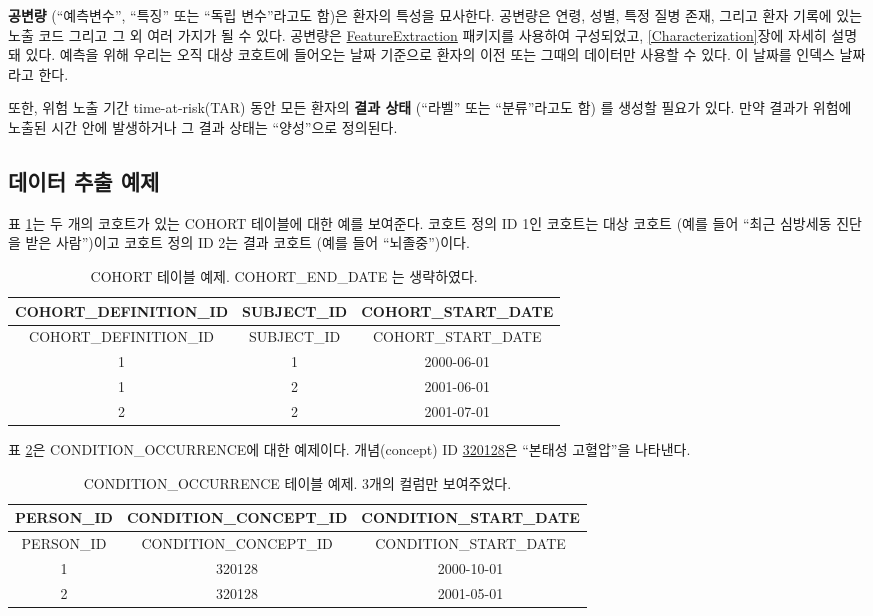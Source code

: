 \documentclass[10.5pt]{book}
\theoremstyle{definition}
\theoremstyle{definition}
\theoremstyle{definition}
\theoremstyle{remark}
\begin{document}
\textbf{공변량} (``예측변수'', ``특징'' 또는 ``독립 변수''라고도 함)은
환자의 특성을 묘사한다. 공변량은 연령, 성별, 특정 질병 존재, 그리고 환자
기록에 있는 노출 코드 그리고 그 외 여러 가지가 될 수 있다. 공변량은
\href{https://ohdsi.github.io/FeatureExtraction/}{FeatureExtraction}
패키지를 사용하여 구성되었고, \ref{Characterization}장에 자세히 설명돼
있다. 예측을 위해 우리는 오직 대상 코호트에 들어오는 날짜 기준으로
환자의 이전 또는 그때의 데이터만 사용할 수 있다. 이 날짜를 인덱스
날짜라고 한다.

또한, 위험 노출 기간 time-at-risk(TAR) 동안 모든 환자의 \textbf{결과
상태} (``라벨'' 또는 ``분류''라고도 함) 를 생성할 필요가 있다. 만약
결과가 위험에 노출된 시간 안에 발생하거나 그 결과 상태는 ``양성''으로
정의된다.  

\subsection{데이터 추출 예제}\label{--}

표 \ref{tab:plpExampleCohorts}는 두 개의 코호트가 있는 COHORT 테이블에
대한 예를 보여준다. 코호트 정의 ID 1인 코호트는 대상 코호트 (예를 들어
``최근 심방세동 진단을 받은 사람'')이고 코호트 정의 ID 2는 결과 코호트
(예를 들어 ``뇌졸중'')이다.

\begin{longtable}[]{@{}ccc@{}}
\caption{\label{tab:plpExampleCohorts} COHORT 테이블 예제. COHORT\_END\_DATE
는 생략하였다.}\tabularnewline
\toprule
COHORT\_DEFINITION\_ID & SUBJECT\_ID &
COHORT\_START\_DATE\tabularnewline
\midrule
\endfirsthead
\toprule
COHORT\_DEFINITION\_ID & SUBJECT\_ID &
COHORT\_START\_DATE\tabularnewline
\midrule
\endhead
1 & 1 & 2000-06-01\tabularnewline
1 & 2 & 2001-06-01\tabularnewline
2 & 2 & 2001-07-01\tabularnewline
\bottomrule
\end{longtable}

표 \ref{tab:plpExampleConditions}은 CONDITION\_OCCURRENCE에 대한
예제이다. 개념(concept) ID
\href{http://athena.ohdsi.org/search-terms/terms/320128}{320128}은
``본태성 고혈압''을 나타낸다.

\begin{longtable}[]{@{}ccc@{}}
\caption{\label{tab:plpExampleConditions} CONDITION\_OCCURRENCE 테이블 예제.
3개의 컬럼만 보여주었다.}\tabularnewline
\toprule
PERSON\_ID & CONDITION\_CONCEPT\_ID &
CONDITION\_START\_DATE\tabularnewline
\midrule
\endfirsthead
\toprule
PERSON\_ID & CONDITION\_CONCEPT\_ID &
CONDITION\_START\_DATE\tabularnewline
\midrule
\endhead
1 & 320128 & 2000-10-01\tabularnewline
2 & 320128 & 2001-05-01\tabularnewline
\bottomrule
\end{longtable}
\end{document}
